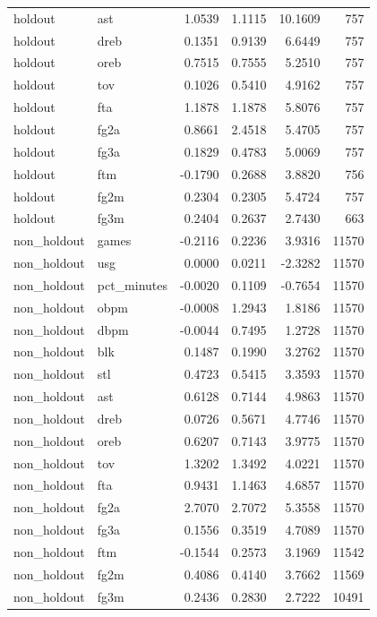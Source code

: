 \begin{table}
\begin{tabular}{llrrrr}
holdout & ast & 1.0539 & 1.1115 & 10.1609 & 757 \\
holdout & dreb & 0.1351 & 0.9139 & 6.6449 & 757 \\
holdout & oreb & 0.7515 & 0.7555 & 5.2510 & 757 \\
holdout & tov & 0.1026 & 0.5410 & 4.9162 & 757 \\
holdout & fta & 1.1878 & 1.1878 & 5.8076 & 757 \\
holdout & fg2a & 0.8661 & 2.4518 & 5.4705 & 757 \\
holdout & fg3a & 0.1829 & 0.4783 & 5.0069 & 757 \\
holdout & ftm & -0.1790 & 0.2688 & 3.8820 & 756 \\
holdout & fg2m & 0.2304 & 0.2305 & 5.4724 & 757 \\
holdout & fg3m & 0.2404 & 0.2637 & 2.7430 & 663 \\
non\_holdout & games & -0.2116 & 0.2236 & 3.9316 & 11570 \\
non\_holdout & usg & 0.0000 & 0.0211 & -2.3282 & 11570 \\
non\_holdout & pct\_minutes & -0.0020 & 0.1109 & -0.7654 & 11570 \\
non\_holdout & obpm & -0.0008 & 1.2943 & 1.8186 & 11570 \\
non\_holdout & dbpm & -0.0044 & 0.7495 & 1.2728 & 11570 \\
non\_holdout & blk & 0.1487 & 0.1990 & 3.2762 & 11570 \\
non\_holdout & stl & 0.4723 & 0.5415 & 3.3593 & 11570 \\
non\_holdout & ast & 0.6128 & 0.7144 & 4.9863 & 11570 \\
non\_holdout & dreb & 0.0726 & 0.5671 & 4.7746 & 11570 \\
non\_holdout & oreb & 0.6207 & 0.7143 & 3.9775 & 11570 \\
non\_holdout & tov & 1.3202 & 1.3492 & 4.0221 & 11570 \\
non\_holdout & fta & 0.9431 & 1.1463 & 4.6857 & 11570 \\
non\_holdout & fg2a & 2.7070 & 2.7072 & 5.3558 & 11570 \\
non\_holdout & fg3a & 0.1556 & 0.3519 & 4.7089 & 11570 \\
non\_holdout & ftm & -0.1544 & 0.2573 & 3.1969 & 11542 \\
non\_holdout & fg2m & 0.4086 & 0.4140 & 3.7662 & 11569 \\
non\_holdout & fg3m & 0.2436 & 0.2830 & 2.7222 & 10491 \\
\bottomrule
\end{tabular}
\end{table}
